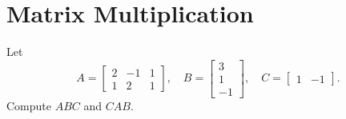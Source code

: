 \section{Matrix Multiplication}

 Let
\begin{equation*}
  A =
  \begin{bmatrix}
    2 & -1 & 1 \\
    1 & 2 & 1
  \end{bmatrix},
  \quad
  B =
  \begin{bmatrix}
    3 \\
    1 \\
    -1
  \end{bmatrix},
  \quad
  C =
  \begin{bmatrix}
    1 & -1
  \end{bmatrix}.
\end{equation*}
Compute $ABC$ and $CAB$.
